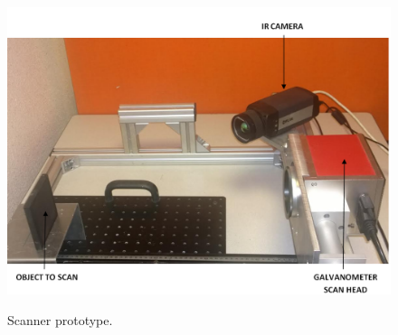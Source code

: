\graphicspath{ {./Figure/Figure6/} }
\begin{figure}
  \centering
  \hspace*{\fill}
	{\includegraphics[width=0.7\linewidth]{fig4c.png}}
  \hspace*{\fill}
	
	\caption{Scanner prototype.}
  \label{fig:4}
\end{figure}
